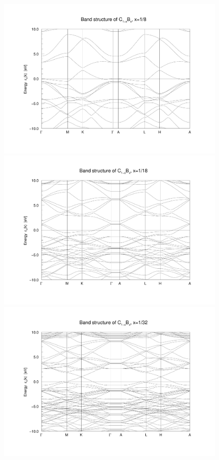 \begin{figure}
\begin{minipage}[t]{0.9\textwidth}
					\end{minipage}
					\begin{minipage}[t]{0.3\textwidth}
						\includegraphics[width=\textwidth]{Results/Bor/Bor2/bor2band.pdf}
					\end{minipage}
					\begin{minipage}[t]{0.3\textwidth}
						\includegraphics[width=\textwidth]{Results/Bor/Bor3/bor3band.pdf}
					\end{minipage}
					\begin{minipage}[t]{0.3\textwidth}
						\includegraphics[width=\textwidth]{Results/Bor/Bor4/bor4band.pdf}

\end{minipage}
\end{figure}
